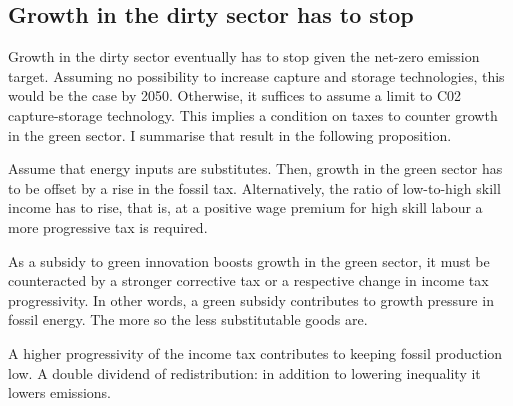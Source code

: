 \subsection{Growth in the dirty sector has to stop}
Growth in the dirty sector eventually has to stop given the net-zero emission target. Assuming no possibility to increase capture and storage technologies, this would be the case by 2050. Otherwise, it suffices to assume a limit to C02 capture-storage technology. This implies a condition on taxes to counter growth in the green sector. I summarise that result in the following proposition.

\begin{prop}Assume that energy inputs are substitutes. Then, growth in the green sector has to be offset by a rise in the fossil tax. Alternatively, %
	the ratio of low-to-high skill income has to rise, that is, at a positive wage premium for high skill labour a more progressive tax is required. 
\end{prop}

\begin{corollary}
	As a subsidy to green innovation boosts growth in the green sector, it must be counteracted by a stronger corrective tax or a respective change in income tax progressivity. In other words, a green subsidy contributes to growth pressure in fossil energy. The more so the less substitutable goods are.
\end{corollary}

\begin{corollary}
	A higher progressivity of the income tax contributes to keeping fossil production low. A double dividend of redistribution: in addition to lowering inequality it lowers emissions.
\end{corollary}

